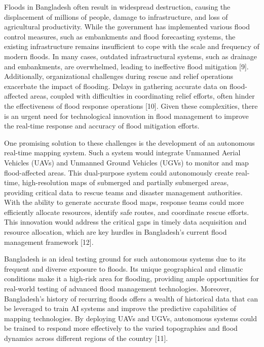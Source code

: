 \documentclass[conference]{IEEEtran}
\begin{document}
Floods in Bangladesh often result in widespread destruction, causing the displacement of millions of people, damage to infrastructure, and loss of agricultural productivity. While the government has implemented various flood control measures, such as embankments and flood forecasting systems, the existing infrastructure remains insufficient to cope with the scale and frequency of modern floods. In many cases, outdated infrastructural systems, such as drainage and embankments, are overwhelmed, leading to ineffective flood mitigation [9]. Additionally, organizational challenges during rescue and relief operations exacerbate the impact of flooding. Delays in gathering accurate data on flood-affected areas, coupled with difficulties in coordinating relief efforts, often hinder the effectiveness of flood response operations [10]. Given these complexities, there is an urgent need for technological innovation in flood management to improve the real-time response and accuracy of flood mitigation efforts.

One promising solution to these challenges is the development of an autonomous real-time mapping system. Such a system would integrate Unmanned Aerial Vehicles (UAVs) and Unmanned Ground Vehicles (UGVs) to monitor and map flood-affected areas. This dual-purpose system could autonomously create real-time, high-resolution maps of submerged and partially submerged areas, providing critical data to rescue teams and disaster management authorities. With the ability to generate accurate flood maps, response teams could more efficiently allocate resources, identify safe routes, and coordinate rescue efforts. This innovation would address the critical gaps in timely data acquisition and resource allocation, which are key hurdles in Bangladesh’s current flood management framework [12].

Bangladesh is an ideal testing ground for such autonomous systems due to its frequent and diverse exposure to floods. Its unique geographical and climatic conditions make it a high-risk area for flooding, providing ample opportunities for real-world testing of advanced flood management technologies. Moreover, Bangladesh’s history of recurring floods offers a wealth of historical data that can be leveraged to train AI systems and improve the predictive capabilities of mapping technologies. By deploying UAVs and UGVs, autonomous systems could be trained to respond more effectively to the varied topographies and flood dynamics across different regions of the country [11].
\end{document}
